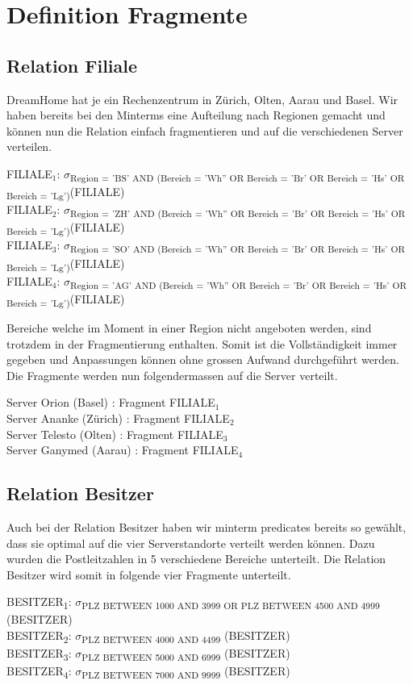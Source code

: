 \documentclass[11pt,a4paper,parskip=half]{scrartcl}
\begin{document}
\section{Definition Fragmente}
\subsection{Relation Filiale}
DreamHome hat je ein Rechenzentrum in Zürich, Olten, Aarau und Basel. Wir haben bereits bei den Minterms eine Aufteilung nach Regionen gemacht und können nun die Relation einfach fragmentieren und auf die verschiedenen Server verteilen. 

FILIALE$_1$: $\sigma$\textsubscript{Region = 'BS' AND (Bereich = 'Wh'' OR Bereich = 'Br' OR Bereich = 'Hs' OR Bereich = 'Lg')}(FILIALE)\\
FILIALE$_2$: $\sigma$\textsubscript{Region = 'ZH' AND (Bereich = 'Wh'' OR Bereich = 'Br' OR Bereich = 'Hs' OR Bereich = 'Lg')}(FILIALE)\\
FILIALE$_3$: $\sigma$\textsubscript{Region = 'SO' AND (Bereich = 'Wh'' OR Bereich = 'Br' OR Bereich = 'Hs' OR Bereich = 'Lg')}(FILIALE)\\
FILIALE$_4$: $\sigma$\textsubscript{Region = 'AG' AND (Bereich = 'Wh'' OR Bereich = 'Br' OR Bereich = 'Hs' OR Bereich = 'Lg')}(FILIALE)

Bereiche welche im Moment in einer Region nicht angeboten werden, sind trotzdem in der Fragmentierung enthalten. Somit ist die Vollständigkeit immer gegeben und Anpassungen können ohne grossen Aufwand durchgeführt werden. Die Fragmente werden nun folgendermassen auf die Server verteilt.

Server Orion (Basel) : Fragment FILIALE$_1$\\
Server Ananke (Zürich) : Fragment FILIALE$_2$\\
Server Telesto (Olten) : Fragment FILIALE$_3$\\
Server Ganymed (Aarau) : Fragment FILIALE$_4$

\subsection{Relation Besitzer}
Auch bei der Relation Besitzer haben wir minterm predicates bereits so gewählt, dass sie optimal auf die vier Serverstandorte verteilt werden können. Dazu wurden die Postleitzahlen in 5 verschiedene Bereiche unterteilt. Die Relation Besitzer wird somit in folgende vier Fragmente unterteilt.

BESITZER\textsubscript{1}: $\sigma$\textsubscript{PLZ  BETWEEN 1000 AND 3999 OR PLZ BETWEEN 4500 AND 4999} (BESITZER)\\
BESITZER\textsubscript{2}: $\sigma$\textsubscript{PLZ  BETWEEN 4000 AND 4499} (BESITZER)\\
BESITZER\textsubscript{3}: $\sigma$\textsubscript{PLZ  BETWEEN 5000 AND 6999} (BESITZER)\\
BESITZER\textsubscript{4}: $\sigma$\textsubscript{PLZ  BETWEEN 7000 AND 9999} (BESITZER)\\
\end{document}
